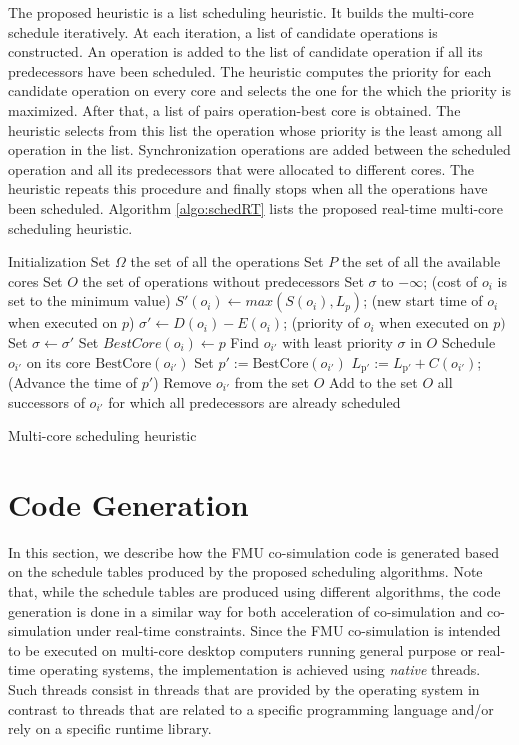 The proposed heuristic is a list scheduling heuristic. It builds the multi-core schedule iteratively. At each iteration, a list of candidate operations is constructed. An operation is added to the list of candidate operation if all its predecessors have been scheduled. The heuristic computes the priority for each candidate operation on every core and selects the one for the which the priority is maximized. After that, a list of pairs operation-best core is obtained. The heuristic selects from this list the operation whose priority is the least among all operation in the list. Synchronization operations are added between the scheduled operation and all its predecessors that were allocated to different cores. The heuristic repeats this procedure and finally stops when all the operations have been scheduled. Algorithm \ref{algo:schedRT} lists the proposed real-time multi-core scheduling heuristic. 

\begin{algorithm}[!htp]		
	  Initialization\;
		Set $\Omega$ the set of all the operations\;  
		Set $P$ the set of all the available cores\; 
 		Set $O$ the set of operations without predecessors\;  		
		{
			{
 				Set $\sigma$ to $-\infty$; (cost of $o_i$ is set to the minimum value)\;
				{
  				$S'(o_i) \leftarrow max(S(o_i) , L_p)$; (new start time of $o_i$ when executed on $p$)\;
  				$\sigma' \leftarrow D(o_i) - E(o_i)$; (priority of $o_i$ when executed on $p)$\;
					{
  					Set $\sigma \leftarrow \sigma'$\;
  					Set $BestCore(o_i) \leftarrow p$\;
  				}
  			}
  		 }
  		 Find $o_{i'}$ with least priority $\sigma$ in $O$\; 
  		 Schedule $o_{i'}$ on its core $\mathrm{BestCore}(o_{i'})$\;
  		 Set $p' := \mathrm{BestCore}(o_{i'})$\;
  		 $L_{\mathrm{p'}} := L_{\mathrm{p'}} + C(o_{i'})$; (Advance the time of $p'$)\;
  		 Remove $o_{i'}$ from the set $O$\;
  		 Add to the set $O$ all successors of $o_{i'}$ for which all predecessors are already scheduled\;
		}
	\caption{Multi-core scheduling heuristic}
	\label{algo:schedRT}
\end{algorithm} 

\section{Code Generation}

In this section, we describe how the FMU co-simulation code is generated based on the schedule tables produced by the proposed scheduling algorithms. Note that, while the schedule tables are produced using different algorithms, the code generation is done in a similar way for both acceleration of co-simulation and co-simulation under real-time constraints. Since the FMU co-simulation is intended to be executed on multi-core desktop computers running general purpose or real-time operating systems, the implementation is achieved using \textit{native} threads. Such threads consist in threads that are provided by the operating system in contrast to threads that are related to a specific programming language and/or rely on a specific runtime library.

